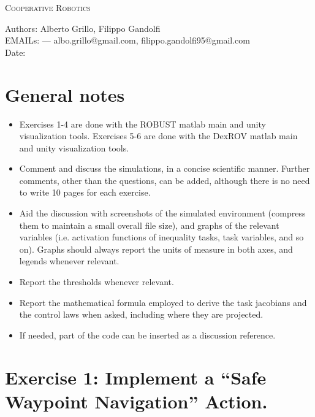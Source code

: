 \documentclass{article}
\makeatletter
\newcommand\frontmatter{%
    \cleardoublepage
  \pagenumbering{roman}}
\newcommand\mainmatter{%
    \cleardoublepage
  \pagenumbering{arabic}}
\makeatother
\begin{document}
\frontmatter
\onecolumn 
\vskip 1cm
\begin{center}
\huge \textsc{Cooperative Robotics}\\
\vskip 1cm

\skip 0.5cm

\vskip 5cm

\normalsize
Authors: Alberto Grillo, Filippo Gandolfi\\
EMAILs: --- albo.grillo@gmail.com, filippo.gandolfi95@gmail.com \\
Date:  \\
\end{center}
\clearpage
\mainmatter
\section*{General notes}

\begin{itemize}
	\item Exercises 1-4 are done with the ROBUST matlab main and unity visualization tools. Exercises 5-6 are done with the DexROV matlab main and unity visualization tools.
	\item Comment and discuss the simulations, in a concise scientific manner. Further comments, other than the questions, can be added, although there is no need to write 10 pages for each exercise.
	\item Aid the discussion with screenshots of the simulated environment (compress them to maintain a small overall file size), and graphs of the relevant variables (i.e. activation functions of inequality tasks, task variables, and so on). Graphs should always report the units of measure in both axes, and legends whenever relevant.
	\item Report the thresholds whenever relevant.
	\item Report the mathematical formula employed to derive the task jacobians and the control laws when asked, including where they are projected.
	\item If needed, part of the code can be inserted as a discussion reference.
\end{itemize} 

\clearpage


\section{Exercise 1: Implement a “Safe Waypoint Navigation” Action.}
\end{document}
